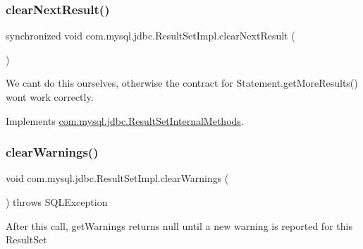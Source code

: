 \subsubsection{\texorpdfstring{clear\+Next\+Result()}{clearNextResult()}}
{\footnotesize\ttfamily synchronized void com.\+mysql.\+jdbc.\+Result\+Set\+Impl.\+clear\+Next\+Result (\begin{DoxyParamCaption}{ }\end{DoxyParamCaption})}

We can\textquotesingle{}t do this ourselves, otherwise the contract for Statement.\+get\+More\+Results() won\textquotesingle{}t work correctly. 

Implements \mbox{\hyperlink{interfacecom_1_1mysql_1_1jdbc_1_1_result_set_internal_methods_abda1557c737e5ac6762d58e43fae2195}{com.\+mysql.\+jdbc.\+Result\+Set\+Internal\+Methods}}.

\mbox{\label{classcom_1_1mysql_1_1jdbc_1_1_result_set_impl_aa7004e3cd1cfb057fb2b7e3a14802c54}} 
\subsubsection{\texorpdfstring{clear\+Warnings()}{clearWarnings()}}
{\footnotesize\ttfamily void com.\+mysql.\+jdbc.\+Result\+Set\+Impl.\+clear\+Warnings (\begin{DoxyParamCaption}{ }\end{DoxyParamCaption}) throws S\+Q\+L\+Exception}

After this call, get\+Warnings returns null until a new warning is reported for this Result\+Set


